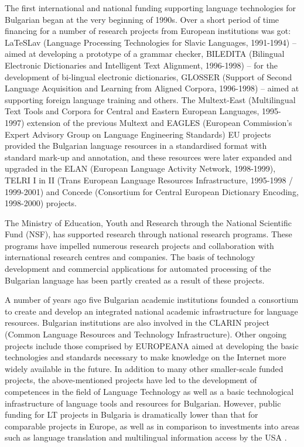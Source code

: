 \documentclass[]{../../metanetpaper}
\begin{document}
\begin{multicols}{2}
The first international and national funding supporting language technologies for Bulgarian began at the very beginning of 1990s. Over a short period of time financing for a number of research projects from European institutions was got: LaTeSLav (Language Processing Technologies for Slavic Languages, 1991-1994) – aimed at developing a prototype of a grammar checker, BILEDITA (Bilingual Electronic Dictionaries and Intelligent Text Alignment, 1996-1998) – for the development of bi-lingual electronic dictionaries, GLOSSER (Support of Second Language Acquisition and Learning from Aligned Corpora, 1996-1998) – aimed at supporting foreign language training and others. The Multext-East (Multilingual Text Tools and Corpora for Central and Eastern European Languages, 1995-1997) extension of the previous Multext and EAGLES (European Commission's Expert Advisory Group on Language Engineering Standards) EU projects provided the Bulgarian language resources in a standardised format
  with standard mark-up and annotation, and these resources were later expanded and upgraded in the ELAN (European Language Activity Network, 1998-1999), TELRI I in II (Trans European Language Resources Infrastructure, 1995-1998 / 1999-2001) and Concede (Consortium for Central European Dictionary Encoding, 1998-2000) projects.

The Ministry of Education, Youth and Research through the National Scientific Fund (NSF), has supported research through national research programs. These programs have impelled numerous research projects and collaboration with international research centres and companies. The basis of technology development and commercial applications for automated processing of the Bulgarian language has been partly created as a result of these projects.

A number of years ago five Bulgarian academic institutions founded a consortium to create and develop an integrated national academic infrastructure for language resources. Bulgarian institutions are also involved in the CLARIN project (Common Language Resources and Technology Infrastructure). Other ongoing projects include those comprised by EUROPEANA aimed at developing the basic technologies and standards necessary to make knowledge on the Internet more widely available in the future. In addition to many other smaller-scale funded projects, the above-mentioned projects have led to the development of competences in the field of Language Technology as well as a basic technological infrastructure of language tools and resources for Bulgarian. However, public funding for LT projects in Bulgaria is dramatically lower than that for comparable projects in Europe, as well as in comparison to investments into areas such as language translation and multilingual information access by
  the USA \cite{sprachtech}.  
  

\end{multicols}
\end{document}
